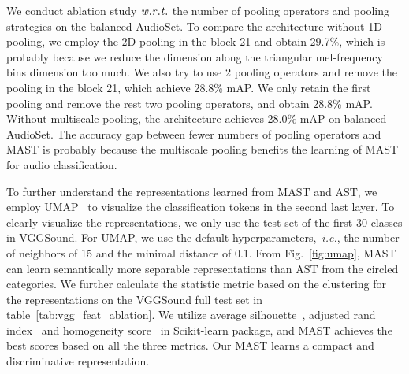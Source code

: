 \documentclass{article}
\def\ie{\emph{i.e.}}
\begin{document}
We conduct ablation study $\it w.r.t.$ the number of pooling operators and pooling strategies on the balanced AudioSet. To compare the architecture without 1D pooling, we employ the 2D pooling in the block 21 and obtain 29.7\%, which is probably because we reduce the dimension along the triangular mel-frequency bins dimension too much. We also try to use 2 pooling operators and remove the pooling in the block 21, which achieve 28.8\% mAP. We only retain the first pooling and remove the rest two pooling operators, and obtain 28.8\% mAP. Without multiscale pooling, the architecture achieves 28.0\% mAP on balanced AudioSet. The accuracy gap between fewer numbers of pooling operators and MAST is probably because the multiscale pooling benefits the learning of MAST for audio classification.

To further understand the representations learned from MAST and AST, we employ UMAP~\cite{mcinnes2018umap} to visualize the classification tokens in the second last layer. To clearly visualize the representations, we only use the test set of the first 30 classes in VGGSound. For UMAP, we use the default hyperparameters,~\ie, the number of neighbors of 15 and the minimal distance of 0.1. From Fig.~\ref{fig:umap}, MAST can learn semantically more separable representations than AST from the circled categories. We further calculate the statistic metric based on the clustering for the representations on the VGGSound full test set in table~\ref{tab:vgg_feat_ablation}. We utilize average silhouette~\cite{rousseeuw1987silhouettes}, adjusted rand index~\cite{hubert1985comparing} and homogeneity score~\cite{rosenberg2007v} in Scikit-learn package, and MAST achieves the best scores based on all the three metrics.
Our MAST learns a compact and discriminative representation.
\end{document}
